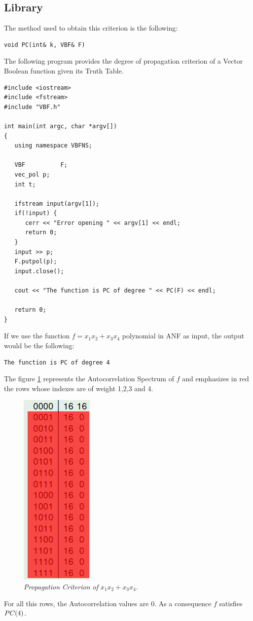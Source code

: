 \subsection{Library}

The method used to obtain this criterion is the following:

\begin{verbatim}
void PC(int& k, VBF& F)
\end{verbatim}

\begin{example}
The following program provides the degree of propagation criterion of a Vector Boolean function given its Truth Table.

\begin{verbatim}
#include <iostream>
#include <fstream>
#include "VBF.h"

int main(int argc, char *argv[])
{
   using namespace VBFNS;

   VBF          F;
   vec_pol p;
   int t;

   ifstream input(argv[1]);
   if(!input) {
      cerr << "Error opening " << argv[1] << endl;
      return 0;
   }
   input >> p;
   F.putpol(p);
   input.close();

   cout << "The function is PC of degree " << PC(F) << endl;

   return 0;
}
\end{verbatim}

If we use the function $f = x_1x_2+x_3x_4$ polynomial in ANF as input, the output would be the following:

\begin{verbatim}
The function is PC of degree 4
\end{verbatim}

The figure \ref{fig:pc} represents the Autocorrelation Spectrum of $f$ and emphasizes in red the rows whose indexes are of weight 1,2,3 and 4.

\begin{figure}[htbp!]
\centering
\includegraphics{pc}
\caption[Propagation Criterion of f]{\textit{Propagation Criterion of }$x_1x_2+x_3x_4$.}
\label{fig:pc}
\end{figure}

For all this rows, the Autocorrelation values are $0$. As a consequence $f$ satisfies $\crit{PC}(4)$.
\end{example}

